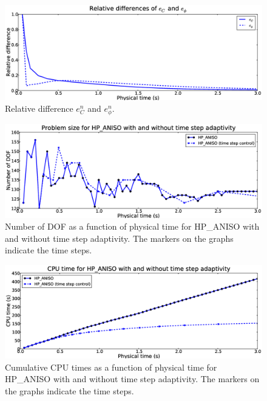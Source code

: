 \begin{figure}[!ht]
  \begin{centering}
  \includegraphics[width=\columnwidth]{cphi_relerr}
  \caption{\label{fig:cphirelerr} Relative difference $e_{C}^n$ and $e_{\phi}^n$.}
  \end{centering}
\end{figure}
\begin{figure}[!ht]
  \begin{centering}
  \includegraphics[width=\columnwidth]{timeadapt_dof}
  \caption{\label{fig:timeadapt_dof} Number of DOF
  as a function of physical time for HP\_ANISO with and without
  time step adaptivity. The markers on the graphs indicate the
  time steps.}
  \end{centering}
\end{figure}
\begin{figure}[!ht]
  \begin{centering}
  \includegraphics[width=\columnwidth]{timeadapt_cpu}
  \caption{\label{fig:timeadapt_cpu} Cumulative CPU times
  as a function of physical time for HP\_ANISO with and without
  time step adaptivity. The markers on the graphs indicate the
  time steps.}
  \end{centering}
\end{figure}

